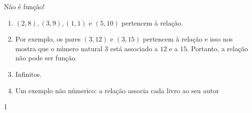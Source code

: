 \begin{answer}{Não é função!}
{
\begin{enumerate}
\item {} 
$(2,8),(3,9), (1,1)$ e $(5,10)$ pertencem à relação.

\item {} 
Por exemplo, os pares $(3,12)$ e $(3,15)$ pertencem à relação e isso nos mostra que o número natural $3$ está associado a $12$ e a $15$. Portanto, a relação não pode ser função.

\item {} 
Infinitos.

\item {} 
Um exemplo não númerico: a relação associa cada livro ao seu autor

\end{enumerate}
}{1}
\end{answer}

